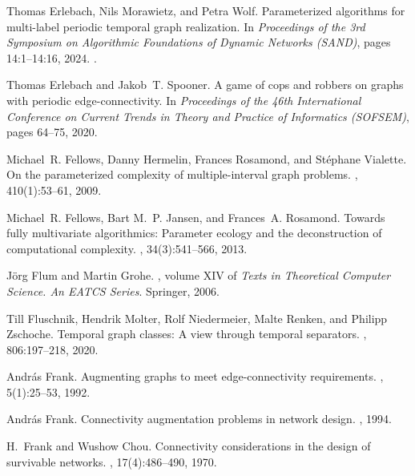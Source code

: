 \documentclass[a4paper,UKenglish,cleveref, autoref, thm-restate]{lipics-v2021}
\begin{document}
\begin{thebibliography}{10}
	Thomas Erlebach, Nils Morawietz, and Petra Wolf.
	\newblock Parameterized algorithms for multi-label periodic temporal graph
	realization.
	\newblock In {\em Proceedings of the 3rd Symposium on Algorithmic Foundations
		of Dynamic Networks ({SAND})}, pages 14:1--14:16, 2024.
	\newblock \href {https://doi.org/10.4230/LIPIcs.SAND.2024.14}
	{}.
	
	Thomas Erlebach and Jakob~T. Spooner.
	\newblock A game of cops and robbers on graphs with periodic edge-connectivity.
	\newblock In {\em Proceedings of the 46th International Conference on Current
		Trends in Theory and Practice of Informatics (SOFSEM)}, pages 64--75, 2020.
	
	Michael~R. Fellows, Danny Hermelin, Frances Rosamond, and St{\'e}phane
	Vialette.
	\newblock On the parameterized complexity of multiple-interval graph problems.
	, 410(1):53--61, 2009.
	
	Michael~R. Fellows, Bart M.~P. Jansen, and Frances~A. Rosamond.
	\newblock Towards fully multivariate algorithmics: {P}arameter ecology and the
	deconstruction of computational complexity.
	, 34(3):541--566, 2013.
	
	J{\"o}rg Flum and Martin Grohe.
	, volume XIV of {\em Texts in
		Theoretical Computer Science. An EATCS Series}.
	\newblock Springer, 2006.
	
	Till Fluschnik, Hendrik Molter, Rolf Niedermeier, Malte Renken, and Philipp
	Zschoche.
	\newblock Temporal graph classes: A view through temporal separators.
	, 806:197--218, 2020.
	
	Andr{\'a}s Frank.
	\newblock Augmenting graphs to meet edge-connectivity requirements.
	, 5(1):25--53, 1992.
	
	Andr{\'a}s Frank.
	\newblock Connectivity augmentation problems in network design.
	, 1994.
	
	H.~Frank and Wushow Chou.
	\newblock Connectivity considerations in the design of survivable networks.
	, 17(4):486--490, 1970.
	

\end{thebibliography}
\end{document}
